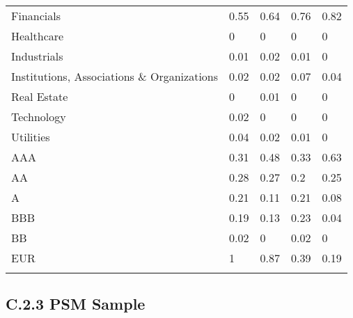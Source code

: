\begin{table}[H]
\begin{tabular}{lllll}
Financials & \cellcolor[HTML]{A8DAB7}0.55 & \cellcolor[HTML]{9BD5AB}0.64 & \cellcolor[HTML]{88CD9B}0.76 & \cellcolor[HTML]{7FCA93}0.82 \\
Healthcare & \cellcolor[HTML]{FCFCFF}0 & \cellcolor[HTML]{FCFCFF}0 & \cellcolor[HTML]{FCFCFF}0 & \cellcolor[HTML]{FCFCFF}0 \\
Industrials & \cellcolor[HTML]{FBFCFE}0.01 & \cellcolor[HTML]{F9FBFD}0.02 & \cellcolor[HTML]{FBFCFE}0.01 & \cellcolor[HTML]{FCFCFF}0 \\
Institutions,   Associations \& Organizations & \cellcolor[HTML]{F9FBFD}0.02 & \cellcolor[HTML]{F9FBFD}0.02 & \cellcolor[HTML]{F2F8F6}0.07 & \cellcolor[HTML]{F6FAFA}0.04 \\
Real Estate & \cellcolor[HTML]{FCFCFF}0 & \cellcolor[HTML]{FBFCFE}0.01 & \cellcolor[HTML]{FCFCFF}0 & \cellcolor[HTML]{FCFCFF}0 \\
Technology & \cellcolor[HTML]{F9FBFD}0.02 & \cellcolor[HTML]{FCFCFF}0 & \cellcolor[HTML]{FCFCFF}0 & \cellcolor[HTML]{FCFCFF}0 \\
Utilities & \cellcolor[HTML]{F6FAFA}0.04 & \cellcolor[HTML]{F9FBFD}0.02 & \cellcolor[HTML]{FBFCFE}0.01 & \cellcolor[HTML]{FCFCFF}0 \\
AAA & \cellcolor[HTML]{CDE9D7}0.31 & \cellcolor[HTML]{B3DFC0}0.48 & \cellcolor[HTML]{CAE8D4}0.33 & \cellcolor[HTML]{9CD5AC}0.63 \\
AA & \cellcolor[HTML]{D2EBDB}0.28 & \cellcolor[HTML]{D3ECDC}0.27 & \cellcolor[HTML]{DEF0E5}0.2 & \cellcolor[HTML]{D6EDDE}0.25 \\
A & \cellcolor[HTML]{DCEFE4}0.21 & \cellcolor[HTML]{ECF6F1}0.11 & \cellcolor[HTML]{DCEFE4}0.21 & \cellcolor[HTML]{F0F8F5}0.08 \\
BBB & \cellcolor[HTML]{DFF1E6}0.19 & \cellcolor[HTML]{E9F4EE}0.13 & \cellcolor[HTML]{D9EEE1}0.23 & \cellcolor[HTML]{F6FAFA}0.04 \\
BB & \cellcolor[HTML]{F9FBFD}0.02 & \cellcolor[HTML]{FCFCFF}0 & \cellcolor[HTML]{F9FBFD}0.02 & \cellcolor[HTML]{FCFCFF}0 \\
EUR & \cellcolor[HTML]{63BE7B}1 & \cellcolor[HTML]{77C78D}0.87 & \cellcolor[HTML]{C1E4CC}0.39 & \cellcolor[HTML]{DFF1E6}0.19 \\
\hline \\[-1.8ex] 
\end{tabular}
\end{table}

\newpage

\subsection{C.2.3 PSM Sample}

